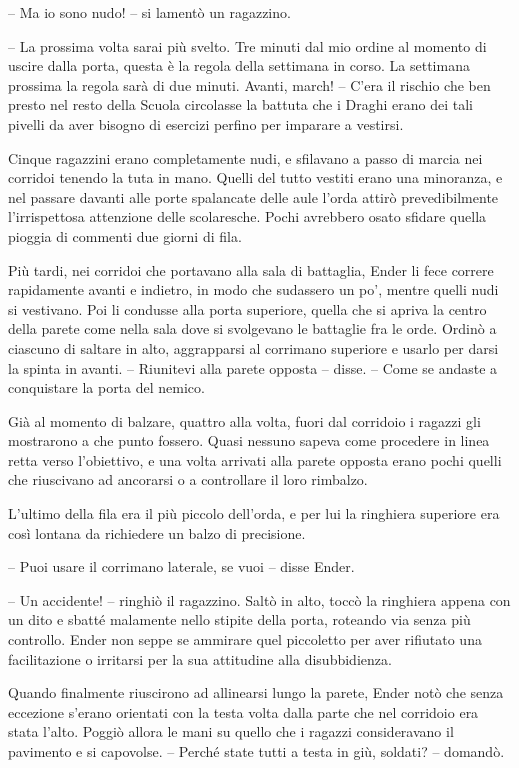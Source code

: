 {-- Ma io sono nudo! -- si lamentò un ragazzino.}

{-- La prossima volta sarai più svelto. Tre minuti dal mio ordine al
	momento di uscire dalla porta, questa è la regola della settimana in
	corso. La settimana prossima la regola sarà di due minuti. Avanti,
	march! -- C'era il rischio che ben presto nel resto della Scuola
	circolasse la battuta che i Draghi erano dei tali pivelli da aver
	bisogno di esercizi perfino per imparare a vestirsi.}

{Cinque ragazzini erano completamente nudi, e sfilavano a passo di
	marcia nei corridoi tenendo la tuta in mano. Quelli del tutto vestiti
	erano una minoranza, e nel passare davanti alle porte spalancate delle
	aule l'orda attirò prevedibilmente l'irrispettosa attenzione delle
	scolaresche. Pochi avrebbero osato sfidare quella pioggia di commenti
	due giorni di fila.}

{Più tardi, nei corridoi che portavano alla sala di battaglia, Ender li
	fece correre rapidamente avanti e indietro, in modo che sudassero un
	po', mentre quelli nudi si vestivano. Poi li condusse alla porta
	superiore, quella che si apriva la centro della parete come nella sala
	dove si svolgevano le battaglie fra le orde. Ordinò a ciascuno di
	saltare in alto, aggrapparsi al corrimano superiore e usarlo per darsi
	la spinta in avanti. -- Riunitevi alla parete opposta -- disse. -- Come
	se andaste a conquistare la porta del nemico.}

{Già al momento di balzare, quattro alla volta, fuori dal corridoio i
	ragazzi gli mostrarono a che punto fossero. Quasi nessuno sapeva come
	procedere in linea retta verso l'obiettivo, e una volta arrivati alla
	parete opposta erano pochi quelli che riuscivano ad ancorarsi o a
	controllare il loro rimbalzo.}

{L'ultimo della fila era il più piccolo dell'orda, e per lui la
	ringhiera superiore era così lontana da richiedere un balzo di
	precisione.}

{-- Puoi usare il corrimano laterale, se vuoi -- disse Ender.}

{-- Un accidente! -- ringhiò il ragazzino. Saltò in alto, toccò la
	ringhiera appena con un dito e sbatté malamente nello stipite della
	porta, roteando via senza più controllo. Ender non seppe se ammirare
	quel piccoletto per aver rifiutato una facilitazione o irritarsi per la
	sua attitudine alla disubbidienza.}

{Quando finalmente riuscirono ad allinearsi lungo la parete, Ender notò
	che senza eccezione s'erano orientati con la testa volta dalla parte che
	nel corridoio era stata l'alto. Poggiò allora le mani su quello che i
	ragazzi consideravano il pavimento e si capovolse. -- Perché state tutti
	a testa in giù, soldati? -- domandò.}

